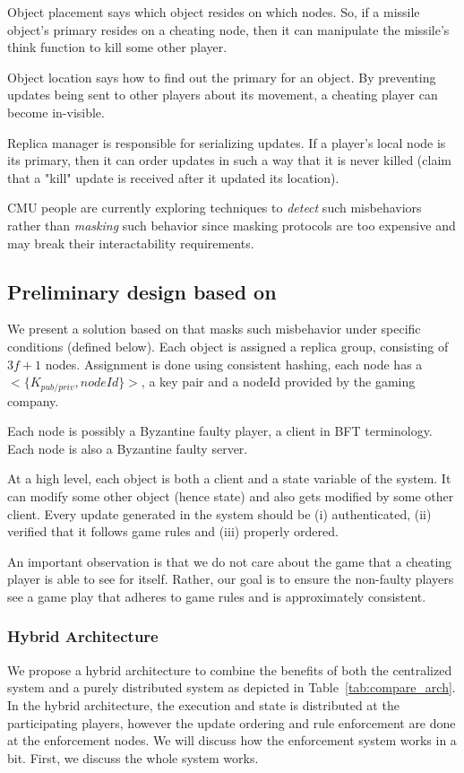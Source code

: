 \documentclass[twocolumn,10pt]{article}
\begin{document}
{Object placement says which object resides on which nodes. So, if a missile object's primary
resides on a cheating node, then it can manipulate the missile's think function to kill
some other player.

Object location says how to find out the primary for an object. By preventing updates being sent
to other players about its movement, a cheating player can become in-visible.

Replica manager is responsible for serializing updates. If a player's local node is its primary,
then it can order updates in such a way that it is never killed (claim that a "kill" update
is received after it updated its location).

CMU people are currently exploring techniques to \emph{detect} such misbehaviors rather than
\emph{masking} such behavior since masking protocols are too expensive and may break their
interactability requirements.

\subsection{Preliminary design based on \Sys}
We present a solution based on \Sys that masks such misbehavior under specific conditions (defined below).
Each object is assigned a replica group, consisting of $3f+1$ nodes. Assignment is done using 
consistent hashing, each node has a $<\{K_{pub/priv}, nodeId\}>$, a key pair 
and a nodeId provided by the gaming company.

Each node is possibly a Byzantine faulty player, a client in BFT terminology. Each node is
also a Byzantine faulty server.

At a high level, each object is both a client and a state variable of the system. It can 
modify some other object (hence state) and also gets modified by some other client. 
\fi
Every update generated in the system should be (i) authenticated, (ii) verified that
it follows game rules and (iii) properly ordered. 


An important observation is that we do not care about the game that a cheating player is
able to see for itself. Rather, our goal is to ensure the non-faulty players see a game play
that adheres to game rules and is approximately consistent. 

\subsubsection{Hybrid Architecture}
We propose a hybrid architecture to combine the benefits of both the centralized system
and a purely distributed system as depicted in Table~\ref{tab:compare_arch}. In the hybrid architecture, the execution and state is distributed at the participating players, however the update ordering and rule enforcement are done at the enforcement nodes. We will discuss how the enforcement system works in a bit. First, we discuss the whole system works.

}
\end{document}

